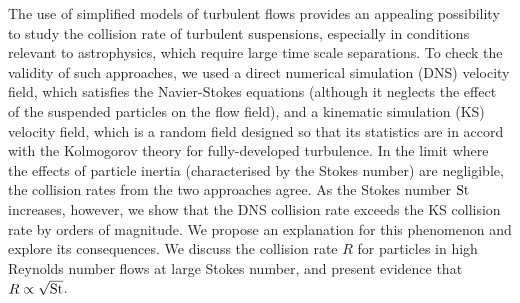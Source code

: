 The use of simplified models of turbulent flows provides an appealing possibility to study the collision rate of turbulent suspensions, especially in conditions relevant to astrophysics, which require large time scale separations.
To check the validity of such approaches, we used a direct numerical simulation (DNS) velocity field, which satisfies the Navier-Stokes equations (although it neglects the effect of the suspended particles on the flow field), and a kinematic simulation (KS) velocity field, which is a random field designed so that its statistics are in accord with the Kolmogorov theory for fully-developed turbulence.
In the limit where the effects of particle inertia (characterised by the Stokes number) are negligible, the collision rates from the two approaches agree.
As the Stokes number ${\rm St}$ increases, however, we show that the DNS collision rate exceeds the KS collision rate by orders of magnitude.
We propose an explanation for this phenomenon and explore its consequences.
We discuss the collision rate $R$ for particles in high Reynolds number flows at large Stokes number, and present evidence that $R\propto \sqrt{{\rm St}}$.

